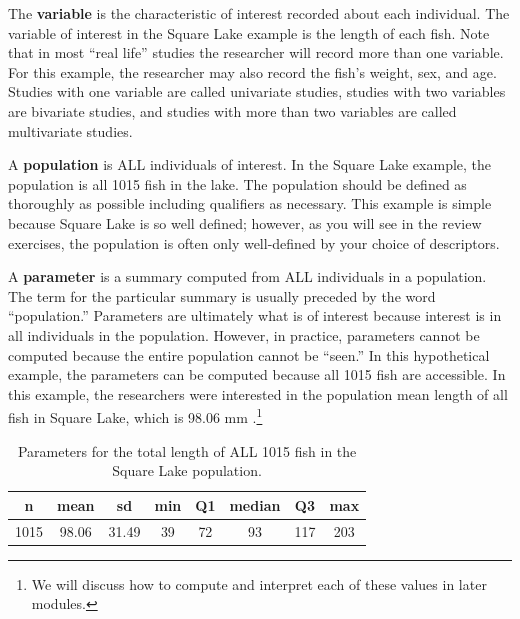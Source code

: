 \documentclass[10pt,openany]{book}\usepackage[]{graphicx}\usepackage[]{color}
\begin{document}

\vspace{-12pt}

The \textbf{variable} is the characteristic of interest recorded about each individual. The variable of interest in the Square Lake example is the length of each fish. Note that in most ``real life'' studies the researcher will record more than one variable.  For this example, the researcher may also record the fish's weight, sex, and age.  Studies with one variable are called univariate studies, studies with two variables are bivariate studies, and studies with more than two variables are called multivariate studies.


A \textbf{population} is ALL individuals of interest. In the Square Lake example, the population is all 1015 fish in the lake.  The population should be defined as thoroughly as possible including qualifiers as necessary.  This example is simple because Square Lake is so well defined; however, as you will see in the review exercises, the population is often only well-defined by your choice of descriptors.


A \textbf{parameter} is a summary computed from ALL individuals in a population.  The term for the particular summary is usually preceded by the word ``population.''  Parameters are ultimately what is of interest because interest is in all individuals in the population.  However, in practice, parameters cannot be computed because the entire population cannot be ``seen.''  In this hypothetical example, the parameters can be computed because all 1015 fish are accessible.  In this example, the researchers were interested in the population mean length of all fish in Square Lake, which is 98.06 mm .\footnote{We will discuss how to compute and interpret each of these values in later modules.}

\begin{table}[ht]
\centering
\caption{Parameters for the total length of ALL 1015 fish in the Square Lake population.} 
\label{tab:SquareLakePopn}
\begin{tabular}{cccccccc}
 n & mean & sd & min & Q1 & median & Q3 & max \\ 
  \hline
1015 & 98.06 & 31.49 & 39 & 72 & 93 & 117 & 203 \\ 
   \hline
\end{tabular}
\end{table}
\end{document}
